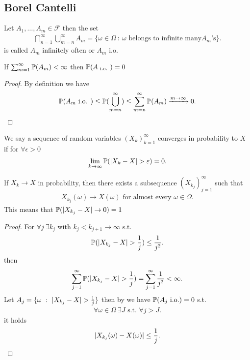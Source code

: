 \subsection{Borel Cantelli}
\begin{definition}
 Let $A_{1},\ldots ,A_m \in \mathcal{F}$   then the set 
 \begin{align*}
   \bigcap_{n=1}^{\infty}\bigcup_{m=n}^{\infty} A_m = \{\omega \in \Omega  \ : \ \omega  \text{ belongs to infinite many} A_{m}\text{'s}\}  
 .\end{align*}
 is called $A_m$ infinitely often or $A_m$ i.o.
\end{definition}
\begin{lemma}\label{borel_cantelli}
 If $\sum_{m=1}^{\infty} \P(A_m) < \infty  $  then $\P(A_ \text{ i.o. }) = 0$
\end{lemma}
\begin{proof}
 By definition we have 
 \begin{align*}
   \P(A_m \text{ i.o. }) \le  \P(\bigcup_{m=n}^{\infty} ) \le \sum_{m=n}^{\infty} \P(A_m)  \xrightarrow{m\to \infty} 0
 .\end{align*}
\end{proof}
\begin{definition}
  We say a sequence of random variables $(X_k)_{k=1}^{\infty} $  converges in probability to $X$ if 
  for $\forall  \epsilon > 0$
  \begin{align*}
    \lim_{k\to \infty} \P(\abs{X_k - X} > \epsilon ) = 0 
  .\end{align*}
\end{definition}
\begin{theorem}
 If $X_k \to  X$  in probability, then there exists 
 a subsequence $(X_{k_j})_{j=1}^{\infty} $ such that 
 \begin{align*}
   X_{k_j}(\omega ) \to X(\omega ) \text{ for almost every } \omega \in  \Omega 
 .\end{align*}
 This means that $\P(\abs{X_{k_j}-X}\to 0) = 1$
\end{theorem}
\begin{proof}
  For $\forall  j \ \exists k_j$  with $k_j < k_{j+1} \to  \infty$ s.t.
  \begin{align*}
    \P(\abs{X_{k_j} - X} > \frac{1}{j}) \le \frac{1}{j^2}
  .\end{align*}
  then 
  \begin{align*}
    \sum_{j=1}^{\infty} \P(\abs{X_{k_j}-X} > \frac{1}{j}) = \sum_{j=1}^{\infty} \frac{1}{j^2}   < \infty
  .\end{align*}
  Let $A_j = \{\omega  \ : \ \abs{X_{k_j}-X} > \frac{1}{j}\}  $ then by  we have $\P(A_j\text{ i.o.}) = 0$ s.t.
  \begin{align*}
    \forall  \omega  \in  \Omega  \ \exists J \text{ s.t. } \forall  j>J
  .\end{align*}
  it holds 
  \begin{align*}
    \abs{X_{k_j}(\omega ) - X(\omega )} \le  \frac{1}{j}
  .\end{align*}
\end{proof}
